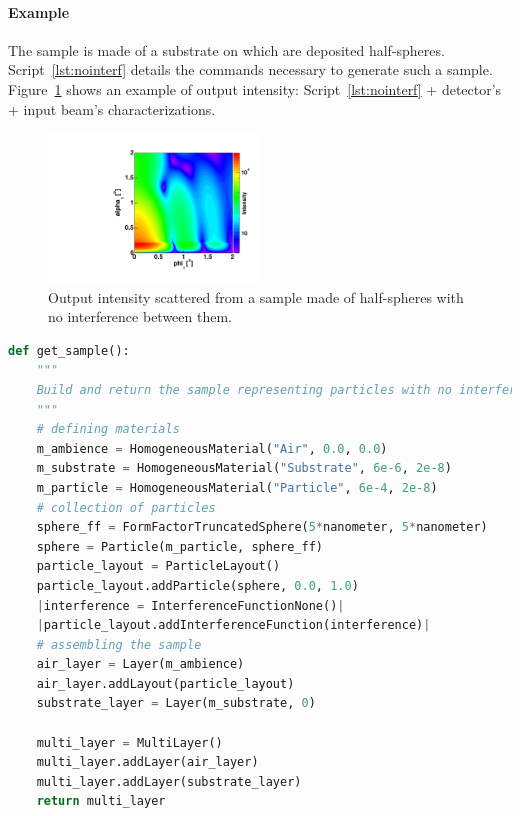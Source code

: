 \paragraph{Example} The sample is made of a substrate on which are deposited half-spheres. Script~\ref{lst:nointerf} details the commands necessary to generate such a sample. Figure~\ref{fig:nointerf} shows an example of output intensity: Script~\ref{lst:nointerf}  + detector's + input beam's characterizations.


\begin{figure}[ht]
\begin{center}
\includegraphics[angle=-90,width=0.5\textwidth]{fig/gisasmap/HSphere_NoInterf.pdf}
\end{center}
\caption{Output intensity scattered from a sample made of half-spheres with no interference between them.}
\label{fig:nointerf}
\end{figure}

\FloatBarrier
\newpage

\begin{lstlisting}[language=python, style=eclipseboxed,numbers=none,nolol,caption={\Code{Python} script to simulate a sample made of half-spheres deposited on a substrate layer without any interference. The part specific to the interferences is marked in a red italic font.},label={lst:nointerf}]
def get_sample():
    """
    Build and return the sample representing particles with no interference
    """
    # defining materials
    m_ambience = HomogeneousMaterial("Air", 0.0, 0.0)
    m_substrate = HomogeneousMaterial("Substrate", 6e-6, 2e-8)
    m_particle = HomogeneousMaterial("Particle", 6e-4, 2e-8)
    # collection of particles
    sphere_ff = FormFactorTruncatedSphere(5*nanometer, 5*nanometer)
    sphere = Particle(m_particle, sphere_ff)
    particle_layout = ParticleLayout()
    particle_layout.addParticle(sphere, 0.0, 1.0)
    |interference = InterferenceFunctionNone()| 
    |particle_layout.addInterferenceFunction(interference)|
    # assembling the sample
    air_layer = Layer(m_ambience)
    air_layer.addLayout(particle_layout)
    substrate_layer = Layer(m_substrate, 0)

    multi_layer = MultiLayer()
    multi_layer.addLayer(air_layer)
    multi_layer.addLayer(substrate_layer)
    return multi_layer
\end{lstlisting}

